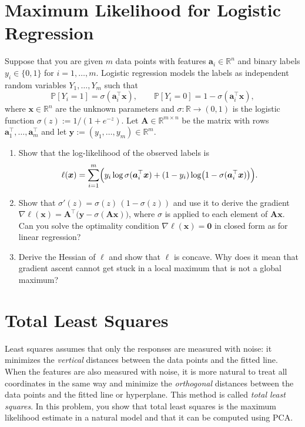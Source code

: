 \documentclass[letterpaper]{article}
\newcommand{\Real}{\mathbb{R}}
\newcommand{\tr}{^\top}
\begin{document}
\section{Maximum Likelihood for Logistic Regression}

Suppose that you are given $m$ data points with features $\bm{a}_i \in \Real^n$ and binary labels $y_i \in \{0, 1\}$ for $i = 1, \dots, m$. Logistic regression models the labels as independent random variables $Y_1, \dots, Y_m$ such that
\[
  \mathbb{P}[Y_i = 1] = \sigma(\bm{a}_i\tr \bm{x}),
  \qquad
  \mathbb{P}[Y_i = 0] = 1 - \sigma(\bm{a}_i\tr \bm{x}),
\]
where $\bm{x} \in \Real^n$ are the unknown parameters and $\sigma\colon \Real \to (0,1)$ is the logistic function $\sigma(z) := 1 / (1 + e^{-z})$. Let $\bm{A} \in \Real^{m\times n}$ be the matrix with rows $\bm{a}_1\tr, \dots, \bm{a}_m\tr$ and let $\bm{y} := (y_1, \dots, y_m) \in \Real^m$.
\begin{enumerate}
\item Show that the log-likelihood of the observed labels is
  \[
    \ell(\bm{x}) = \sum_{i=1}^m \Bigl( y_i \log \sigma(\bm{a}_i\tr \bm{x}) + (1 - y_i) \log \bigl(1 - \sigma(\bm{a}_i\tr \bm{x})\bigr) \Bigr).
  \]
\item Show that $\sigma'(z) = \sigma(z)\,(1 - \sigma(z))$ and use it to derive the gradient $\nabla \ell(\bm{x}) = \bm{A}\tr \bigl(\bm{y} - \sigma(\bm{A}\bm{x})\bigr)$, where $\sigma$ is applied to each element of $\bm{A}\bm{x}$. Can you solve the optimality condition $\nabla \ell(\bm{x}) = \bm{0}$ in closed form as for linear regression?
\item Derive the Hessian of $\ell$ and show that $\ell$ is concave. Why does it mean that gradient ascent cannot get stuck in a local maximum that is not a global maximum?
\end{enumerate}

\section{Total Least Squares}

Least squares assumes that only the responses are measured with noise: it minimizes the \emph{vertical} distances between the data points and the fitted line. When the features are also measured with noise, it is more natural to treat all coordinates in the same way and minimize the \emph{orthogonal} distances between the data points and the fitted line or hyperplane. This method is called \emph{total least squares}. In this problem, you show that total least squares is the maximum likelihood estimate in a natural model and that it can be computed using PCA.
\end{document}
